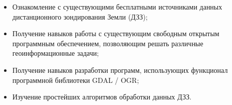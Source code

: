 
\begin{itemize}

	\item Ознакомление с существующими бесплатными источниками данных дистанционного зондирования Земли (ДЗЗ);
	\item Получение навыков работы с существующим свободным открытым программным обеспечением, позволяющим решать различные геоинформационные задачи;
	\item Получение навыков разработки программ, использующих функционал программной библиотеки GDAL / OGR;
	\item Изучение простейших алгоритмов обработки данных ДЗЗ.

\end{itemize}

